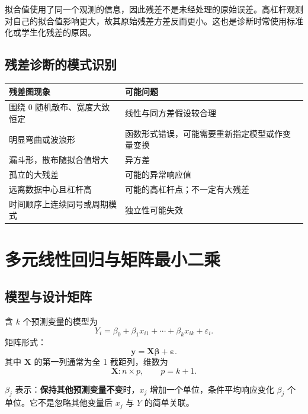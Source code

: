 \documentclass[11pt,a4paper]{article}
\newcommand{\1}{\mathbf{1}}
\newcommand{\by}{\mathbf{y}}
\newcommand{\bX}{\mathbf{X}}
\newcommand{\bbeta}{\boldsymbol{\beta}}
\newcommand{\bvarepsilon}{\boldsymbol{\varepsilon}}
\begin{document}
\begin{conceptbox}[为什么残差方差小于误差方差]
拟合值使用了同一个观测的信息，因此残差不是未经处理的原始误差。高杠杆观测对自己的拟合值影响更大，故其原始残差方差反而更小。这也是诊断时常使用标准化或学生化残差的原因。
\end{conceptbox}

\subsection{残差诊断的模式识别}

\begin{center}
\begin{tabularx}{\textwidth}{p{3.7cm}X}
\toprule
残差图现象 & 可能问题\\
\midrule
围绕 0 随机散布、宽度大致恒定 & 线性与同方差假设较合理\\
明显弯曲或波浪形 & 函数形式错误，可能需要重新指定模型或作变量变换\\
漏斗形，散布随拟合值增大 & 异方差\\
孤立的大残差 & 可能的异常响应值\\
远离数据中心且杠杆高 & 可能的高杠杆点；不一定有大残差\\
时间顺序上连续同号或周期模式 & 独立性可能失效\\
\bottomrule
\end{tabularx}
\end{center}

\section{多元线性回归与矩阵最小二乘}

\subsection{模型与设计矩阵}

含 $k$ 个预测变量的模型为
\[
  Y_i=\beta_0+\beta_1x_{i1}+\cdots+\beta_kx_{ik}+\varepsilon_i.
\]
矩阵形式：
\[
  \boxed{\by=\bX\bbeta+\bvarepsilon.}
\]
其中 $\bX$ 的第一列通常为全 1 截距列，维数为
\[
  \bX:n\times p,
  \qquad p=k+1.
\]

\begin{conceptbox}[多元回归系数的解释]
$\beta_j$ 表示：\textbf{保持其他预测变量不变}时，$x_j$ 增加一个单位，条件平均响应变化 $\beta_j$ 个单位。它不是忽略其他变量后 $x_j$ 与 $Y$ 的简单关联。
\end{conceptbox}
\end{document}
